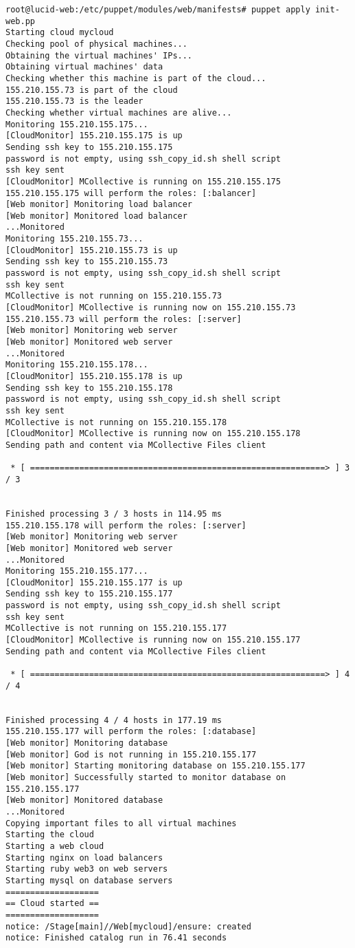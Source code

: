 \begin{lstlisting}
root@lucid-web:/etc/puppet/modules/web/manifests# puppet apply init-web.pp 
Starting cloud mycloud
Checking pool of physical machines...
Obtaining the virtual machines' IPs...
Obtaining virtual machines' data
Checking whether this machine is part of the cloud...
155.210.155.73 is part of the cloud
155.210.155.73 is the leader
Checking whether virtual machines are alive...
Monitoring 155.210.155.175...
[CloudMonitor] 155.210.155.175 is up
Sending ssh key to 155.210.155.175
password is not empty, using ssh_copy_id.sh shell script
ssh key sent
[CloudMonitor] MCollective is running on 155.210.155.175
155.210.155.175 will perform the roles: [:balancer]
[Web monitor] Monitoring load balancer
[Web monitor] Monitored load balancer
...Monitored
Monitoring 155.210.155.73...
[CloudMonitor] 155.210.155.73 is up
Sending ssh key to 155.210.155.73
password is not empty, using ssh_copy_id.sh shell script
ssh key sent
MCollective is not running on 155.210.155.73
[CloudMonitor] MCollective is running now on 155.210.155.73
155.210.155.73 will perform the roles: [:server]
[Web monitor] Monitoring web server
[Web monitor] Monitored web server
...Monitored
Monitoring 155.210.155.178...
[CloudMonitor] 155.210.155.178 is up
Sending ssh key to 155.210.155.178
password is not empty, using ssh_copy_id.sh shell script
ssh key sent
MCollective is not running on 155.210.155.178
[CloudMonitor] MCollective is running now on 155.210.155.178
Sending path and content via MCollective Files client

 * [ ============================================================> ] 3 / 3


Finished processing 3 / 3 hosts in 114.95 ms
155.210.155.178 will perform the roles: [:server]
[Web monitor] Monitoring web server
[Web monitor] Monitored web server
...Monitored
Monitoring 155.210.155.177...
[CloudMonitor] 155.210.155.177 is up
Sending ssh key to 155.210.155.177
password is not empty, using ssh_copy_id.sh shell script
ssh key sent
MCollective is not running on 155.210.155.177
[CloudMonitor] MCollective is running now on 155.210.155.177
Sending path and content via MCollective Files client

 * [ ============================================================> ] 4 / 4


Finished processing 4 / 4 hosts in 177.19 ms
155.210.155.177 will perform the roles: [:database]
[Web monitor] Monitoring database
[Web monitor] God is not running in 155.210.155.177
[Web monitor] Starting monitoring database on 155.210.155.177
[Web monitor] Successfully started to monitor database on 155.210.155.177
[Web monitor] Monitored database
...Monitored
Copying important files to all virtual machines
Starting the cloud
Starting a web cloud
Starting nginx on load balancers
Starting ruby web3 on web servers
Starting mysql on database servers
===================
== Cloud started ==
===================
notice: /Stage[main]//Web[mycloud]/ensure: created
notice: Finished catalog run in 76.41 seconds
\end{lstlisting}

